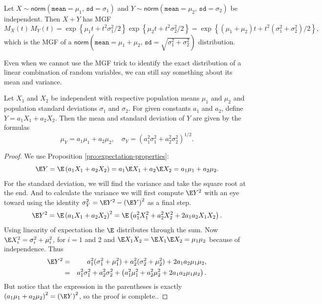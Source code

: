 \documentclass[captions=tableheading]{scrbook}
\begin{document}
\begin{example}
Let \(X\sim\mathsf{norm}(\mathtt{mean}=\mu_{1},\,\mathtt{sd}=\sigma_{1})\) and \(Y\sim\mathsf{norm}(\mathtt{mean}=\mu_{2},\,\mathtt{sd}=\sigma_{2})\) be independent. Then \(X+Y\) has MGF
\[
M_{X}(t)\, M_{Y}(t)=\exp\left\{ \mu_{1}t+t^{2}\sigma_{1}^{2}/2\right\} \exp\left\{ \mu_{2}t+t^{2}\sigma_{2}^{2}/2\right\} =\exp\left\{ \left(\mu_{1}+\mu_{2}\right)t+t^{2}\left(\sigma_{1}^{2}+\sigma_{2}^{2}\right)/2\right\} ,
\]
which is the MGF of a \(\mathsf{norm}\left(\mathtt{mean}=\mu_{1}+\mu_{2},\,\mathtt{sd}=\sqrt{\sigma_{1}^{2}+\sigma_{2}^{2}}\right)\) distribution. 
\end{example}

Even when we cannot use the MGF trick to identify the exact distribution of a linear combination of random variables, we can still say something about its mean and variance.

\begin{prop}
\label{pro:mean-sd-lin-comb-two}
Let \(X_{1}\) and \(X_{2}\) be independent with respective population means \(\mu_{1}\) and \(\mu_{2}\) and population standard deviations \(\sigma_{1}\) and \(\sigma_{2}\). For given constants \(a_{1}\) and \(a_{2}\), define \(Y=a_{1}X_{1}+a_{2}X_{2}\). Then the mean and standard deviation of \(Y\) are given by the formulas
\begin{equation}
\mu_{Y}=a_{1}\mu_{1}+a_{2}\mu_{2},\quad\sigma_{Y}=\left(a_{1}^{2}\sigma_{1}^{2}+a_{2}^{2}\sigma_{2}^{2}\right)^{1/2}.
\end{equation}
\end{prop}

\begin{proof}
We use Proposition \ref{pro:expectation-properties}:
\[
\E Y=\E\left(a_{1}X_{1}+a_{2}X_{2}\right)=a_{1}\E X_{1}+a_{2}\E X_{2}=a_{1}\mu_{1}+a_{2}\mu_{2}.
\]
For the standard deviation, we will find the variance and take the square root at the end. And to calculate the variance we will first compute \(\E Y^{2}\) with an eye toward using the identity \(\sigma_{Y}^{2}=\E Y^{2}-\left(\E Y\right)^{2}\) as a final step. 
\[
\E Y^{2}=\E\left(a_{1}X_{1}+a_{2}X_{2}\right)^{2}=\E\left(a_{1}^{2}X_{1}^{2}+a_{2}^{2}X_{2}^{2}+2a_{1}a_{2}X_{1}X_{2}\right).
\]
Using linearity of expectation the \(\E\) distributes through the sum. Now \(\E X_{i}^{2}=\sigma_{i}^{2}+\mu_{i}^{2}\), for \(i=1\) and 2 and \(\E X_{1}X_{2}=\E X_{1}\E X_{2}=\mu_{1}\mu_{2}\) because of independence. Thus
\begin{eqnarray*}
\E Y^{2} & = & a_{1}^{2}(\sigma_{1}^{2}+\mu_{1}^{2})+a_{2}^{2}(\sigma_{2}^{2}+\mu_{2}^{2})+2a_{1}a_{2}\mu_{1}\mu_{2},\\
 & = & a_{1}^{2}\sigma_{1}^{2}+a_{2}^{2}\sigma_{2}^{2}+\left(a_{1}^{2}\mu_{1}^{2}+a_{2}^{2}\mu_{2}^{2}+2a_{1}a_{2}\mu_{1}\mu_{2}\right).
\end{eqnarray*}
But notice that the expression in the parentheses is exactly \(\left(a_{1}\mu_{1}+a_{2}\mu_{2}\right)^{2}=\left(\E Y\right)^{2}\), so the proof is complete.. 
\end{proof}
\end{document}

